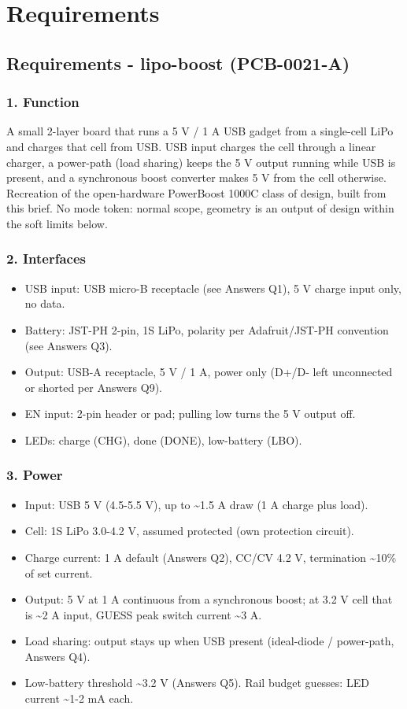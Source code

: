 \documentclass[11pt]{article}
\begin{document}
\section{Requirements}
\subsection*{Requirements - lipo-boost (PCB-0021-A)}
\subsubsection*{1. Function}
A small 2-layer board that runs a 5 V / 1 A USB gadget from a single-cell LiPo and charges that cell from USB. USB input charges the cell through a linear charger, a power-path (load sharing) keeps the 5 V output running while USB is present, and a synchronous boost converter makes 5 V from the cell otherwise. Recreation of the open-hardware PowerBoost 1000C class of design, built from this brief. No mode token: normal scope, geometry is an output of design within the soft limits below.

\subsubsection*{2. Interfaces}
\begin{itemize}
\item USB input: USB micro-B receptacle (see Answers Q1), 5 V charge input only, no data.
\item Battery: JST-PH 2-pin, 1S LiPo, polarity per Adafruit/JST-PH convention (see Answers Q3).
\item Output: USB-A receptacle, 5 V / 1 A, power only (D+/D- left unconnected or shorted per Answers Q9).
\item EN input: 2-pin header or pad; pulling low turns the 5 V output off.
\item LEDs: charge (CHG), done (DONE), low-battery (LBO).
\end{itemize}
\subsubsection*{3. Power}
\begin{itemize}
\item Input: USB 5 V (4.5-5.5 V), up to \textasciitilde{}1.5 A draw (1 A charge plus load).
\item Cell: 1S LiPo 3.0-4.2 V, assumed protected (own protection circuit).
\item Charge current: 1 A default (Answers Q2), CC/CV 4.2 V, termination \textasciitilde{}10\% of set current.
\item Output: 5 V at 1 A continuous from a synchronous boost; at 3.2 V cell that is \textasciitilde{}2 A input, GUESS peak switch current \textasciitilde{}3 A.
\item Load sharing: output stays up when USB present (ideal-diode / power-path, Answers Q4).
\item Low-battery threshold \textasciitilde{}3.2 V (Answers Q5). Rail budget guesses: LED current \textasciitilde{}1-2 mA each.
\end{itemize}
\end{document}
